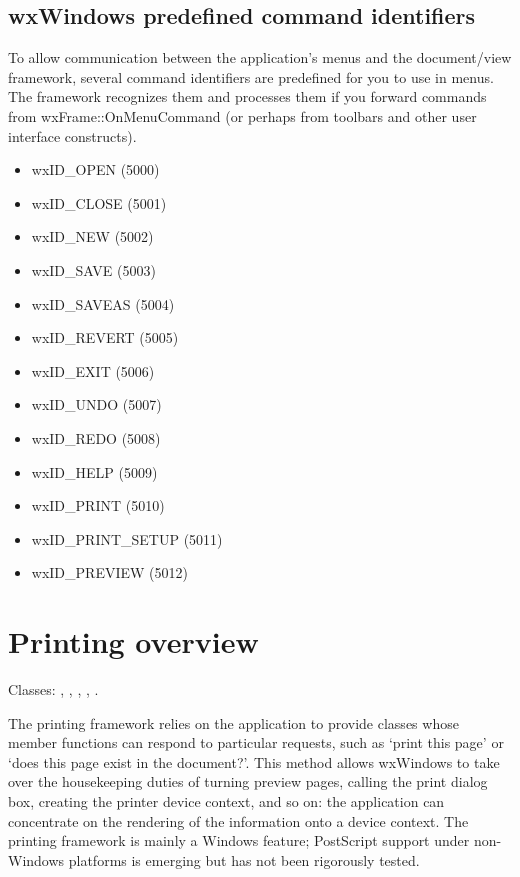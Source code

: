 \subsection{wxWindows predefined command identifiers}\label{predefinedids}

To allow communication between the application's menus and the
document/view framework, several command identifiers are predefined for you
to use in menus. The framework recognizes them and processes them if you
forward commands from wxFrame::OnMenuCommand (or perhaps from toolbars and
other user interface constructs).

\begin{itemize}\itemsep=0pt
\item wxID\_OPEN (5000)
\item wxID\_CLOSE (5001)
\item wxID\_NEW (5002)
\item wxID\_SAVE (5003)
\item wxID\_SAVEAS (5004)
\item wxID\_REVERT (5005)
\item wxID\_EXIT (5006)
\item wxID\_UNDO (5007)
\item wxID\_REDO (5008)
\item wxID\_HELP (5009)
\item wxID\_PRINT (5010)
\item wxID\_PRINT\_SETUP (5011)
\item wxID\_PREVIEW (5012)
\end{itemize}

\section{Printing overview}\label{printingoverview}

Classes: , ,\rtfsp
{}, ,\rtfsp
{}.

The printing framework relies on the application to provide classes
whose member functions can respond to particular requests, such
as `print this page' or `does this page exist in the document?'.
This method allows wxWindows to take over the housekeeping duties of
turning preview pages, calling the print dialog box, creating
the printer device context, and so on: the application can concentrate
on the rendering of the information onto a device context.
The printing framework is mainly a Windows feature; PostScript
support under non-Windows platforms is emerging but has not been rigorously tested.

